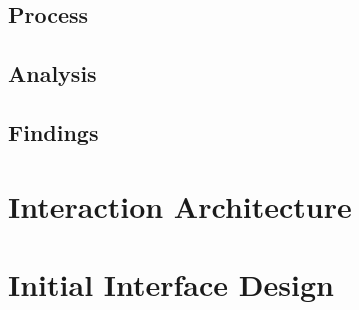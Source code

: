 \documentclass[12pt]{article}
\begin{document}
\subsection{Process}
\subsection{Analysis}
\subsection{Findings}

\section{Interaction Architecture}

\section{Initial Interface Design}
\end{document}
